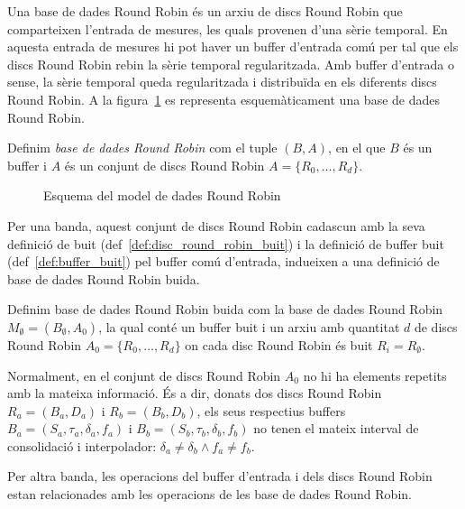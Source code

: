 {Una base de dades Round Robin és un arxiu de discs Round Robin que comparteixen l'entrada de mesures, les quals provenen d'una sèrie temporal. En aquesta entrada de mesures hi pot haver un buffer d'entrada comú per tal que els discs Round Robin rebin la sèrie temporal regularitzada. Amb buffer d'entrada o sense, la sèrie temporal queda regularitzada i distribuïda en els diferents discs Round Robin. A la figura~\ref{fig:model:esquemarrd} es representa esquemàticament una base de dades Round Robin.

\begin{definition}
  Definim \emph{base de dades Round Robin} com el tuple $(B,A)$, en el
  que $B$ és un buffer i $A$ és un conjunt de discs Round Robin
  $A=\{R_0,\ldots,R_d\}$.
\end{definition}


\begin{figure}[htp]
\centering
\setlength{\unitlength}{0.4mm}

\caption{Esquema del model de dades Round Robin}
\label{fig:model:esquemarrd}
\end{figure}


Per una banda, aquest conjunt de discs Round Robin cadascun amb la
seva definició de buit (def~\ref{def:disc_round_robin_buit}) i
la definició de buffer buit (def~\ref{def:buffer_buit}) pel buffer comú
d'entrada, indueixen a una definició de base de dades Round Robin
buida.

\begin{definition}
  Definim base de dades Round Robin buida com la base de dades Round
  Robin $M_{\emptyset} = (B_{\emptyset},A_0)$, la qual conté un buffer
  buit i un arxiu amb quantitat $d$ de discs Round Robin $A_0 =
  \{R_0,\ldots,R_d\}$ on cada disc Round Robin és buit
  $R_i=R_{\emptyset}$.
\end{definition}

Normalment, en el conjunt de discs Round Robin $A_0$ no hi ha elements
repetits amb la mateixa informació. És a dir, donats dos discs Round
Robin $R_a = (B_a, D_a)$ i $R_b = (B_b, D_b)$, els seus respectius
buffers $B_a=(S_a,\tau_a,\delta_a,f_a)$ i
$B_b=(S_b,\tau_b,\delta_b,f_b)$ no tenen el mateix interval de
consolidació i interpolador: $\delta_a \neq \delta_b \wedge f_a \neq
f_b$. 



Per altra banda, les operacions del buffer d'entrada i dels discs
Round Robin estan relacionades amb les operacions de les base de dades
Round Robin.

}
